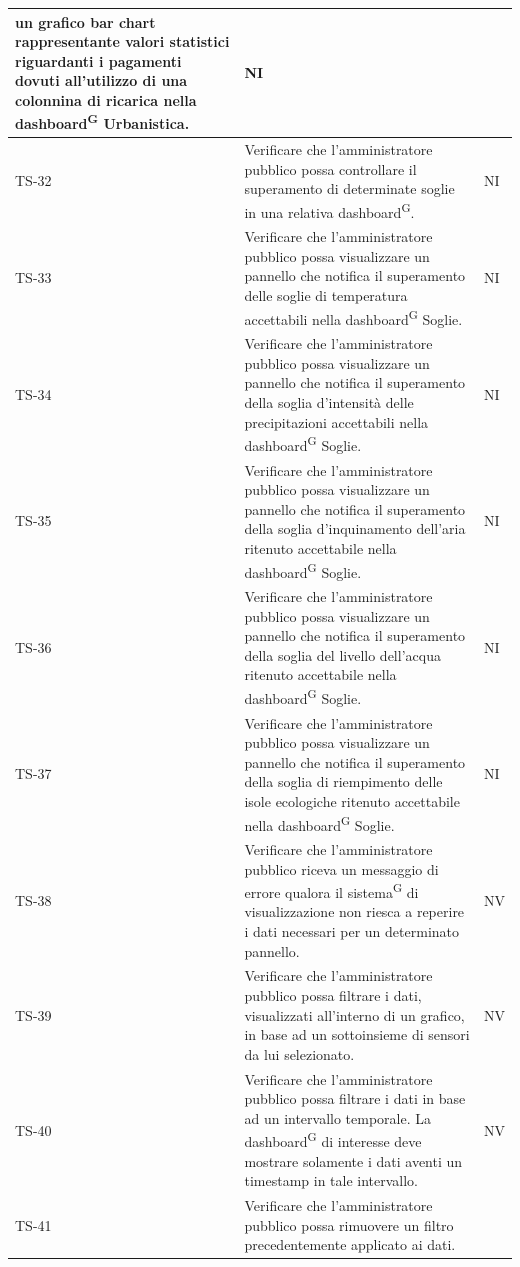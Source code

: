 \documentclass[8pt]{article}
\newcommand{\glossterm}[1]{#1\textsuperscript{G}} %
\begin{document}
\begin{longtable}{|>{\centering}p{2cm}|>{\RaggedRight}m{12cm}|>{\centering\arraybackslash}p{2cm}|}
    un grafico bar chart rappresentante valori statistici riguardanti i pagamenti dovuti all'utilizzo di una colonnina di ricarica nella \glossterm{dashboard} Urbanistica.
    & NI \\
    \hline
    TS-32 & Verificare che l'amministratore pubblico possa controllare il superamento di determinate soglie in una relativa \glossterm{dashboard}. &
    NI \\
    \hline
    TS-33 & Verificare che l'amministratore pubblico possa visualizzare un pannello che notifica il superamento delle soglie di temperatura accettabili nella \glossterm{dashboard} Soglie. &
    NI \\
    \hline
    TS-34 &Verificare che l'amministratore pubblico possa visualizzare un pannello che notifica il superamento della soglia d'intensità delle precipitazioni accettabili nella \glossterm{dashboard} Soglie. &
    NI \\
    \hline
    TS-35 & Verificare che l'amministratore pubblico possa visualizzare un pannello che notifica il superamento della soglia d'inquinamento dell'aria ritenuto accettabile nella \glossterm{dashboard} Soglie. &
    NI \\
    \hline
    TS-36 & Verificare che l'amministratore pubblico possa visualizzare un pannello che notifica il superamento della soglia del livello dell'acqua ritenuto accettabile nella \glossterm{dashboard} Soglie. &
    NI \\
    \hline
    TS-37 & Verificare che l'amministratore pubblico possa visualizzare un pannello che notifica il superamento della soglia di riempimento delle isole ecologiche ritenuto accettabile nella \glossterm{dashboard} Soglie. &
    NI \\
    \hline
    TS-38 & Verificare che l'amministratore pubblico riceva un messaggio di errore qualora il
    \glossterm{sistema} di visualizzazione non riesca a reperire i dati necessari per un determinato pannello. &
    NV \\
    \hline
    TS-39 & Verificare che l'amministratore pubblico possa filtrare i dati, visualizzati
    all’interno di un grafico, in base ad un sottoinsieme di sensori da lui
    selezionato. & NV \\
    \hline
    TS-40 & Verificare che l'amministratore pubblico possa filtrare i dati in base ad un intervallo temporale. La \glossterm{dashboard} di interesse deve mostrare solamente i dati aventi un timestamp in tale intervallo.
    & NV\\
    \hline
    TS-41 & Verificare che l'amministratore pubblico possa rimuovere un filtro precedentemente applicato ai dati.

\end{longtable}
\end{document}
